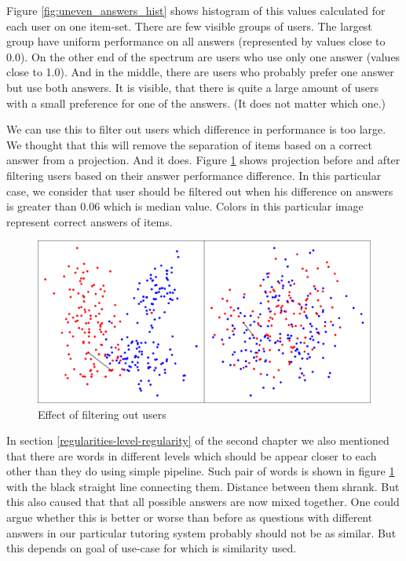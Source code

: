 \documentclass[
  digital, %
  table,   %
  nolof,     %
  nolot,     %
  nocover,
  color
]{fithesis3}
\begin{document}
Figure \ref{fig:uneven_answers_hist} shows histogram of this values calculated for each user on one item-set. There are few visible groups of users. The largest group have uniform performance on all answers (represented by values close to 0.0). On the other end of the spectrum are users who use only one answer (values close to 1.0). And in the middle, there are users who probably prefer one answer but use both answers. It is visible, that there is quite a large amount of users with a small preference for one of the answers. (It does not matter which one.)


We can use this to filter out users which difference in performance is too large. We thought that this will remove the separation of items based on a correct answer from a projection. And it does. Figure \ref{fig:answers_normalization} shows projection before and after filtering users based on their answer performance difference. In this particular case, we consider that user should be filtered out when his difference on answers is greater than 0.06 which is median value. Colors in this particular image represent correct answers of items.

\begin{figure}
  \includegraphics[width=\textwidth]{img/answers_normalization}
  \caption{Effect of filtering out users}
  \label{fig:answers_normalization}
\end{figure}

In section \ref{regularities-level-regularity} of the second chapter we also mentioned that there are words in different levels which should be appear closer to each other than they do using simple pipeline. Such pair of words is shown in figure \ref{fig:answers_normalization} with the black straight line connecting them. Distance between them shrank. But this also caused that that all possible answers are now mixed together. One could argue whether this is better or worse than before as questions with different answers in our particular tutoring system probably should not be as similar. But this depends on goal of use-case for which is similarity used.
\end{document}
